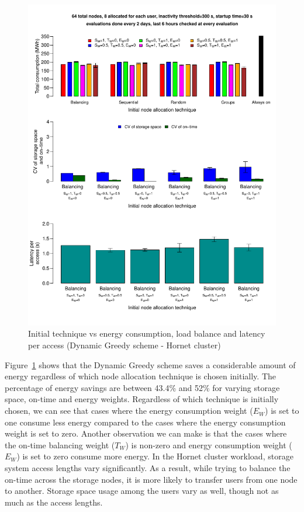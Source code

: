 \documentclass[preprint,12pt]{elsarticle}
\begin{document}
\begin{figure}[!htbp]
\centering
\includegraphics[width=\columnwidth,keepaspectratio]{FIG9.pdf}
\caption{Initial technique vs energy consumption, load balance and latency per access (Dynamic Greedy scheme - Hornet cluster)}
\label{fourthresult}
\end{figure}

Figure~\ref{fourthresult} shows that the Dynamic Greedy scheme saves a considerable amount of energy regardless of
which node allocation technique is chosen initially. The percentage of energy savings are between 43.4\% and 52\%
for varying storage space, on-time and energy weights. Regardless of which technique is initially chosen, we can
see that cases where the energy consumption weight ($E_W$) is set to one consume less energy compared to the cases
where the energy consumption weight is set to zero. Another observation we can make is that the cases where the
on-time balancing weight ($T_W$) is non-zero and energy consumption weight ($E_W$) is set to zero consume more
energy. In the Hornet cluster workload, storage system access lengths vary significantly. As a result,
while trying to balance the on-time across the storage nodes, it is more likely to transfer users from one node
to another. Storage space usage among the users vary as well, though not as much as the access lengths.
\end{document}
